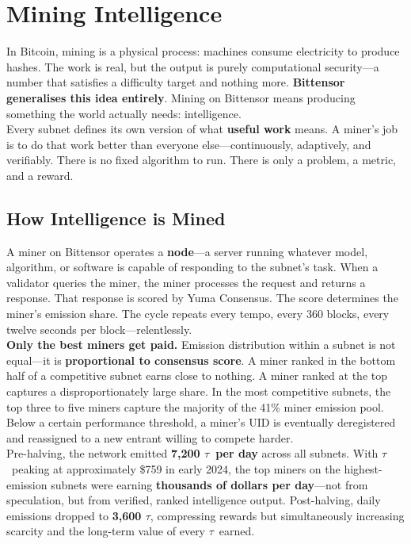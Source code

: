 \documentclass[12pt, a4paper, oneside]{report}
\newcommand{\TAO}{$\tau$}            %
\theoremstyle{definition}
\begin{document}
\chapter{Mining Intelligence}
\label{chap:mining_intelligence}

In Bitcoin, mining is a physical process: machines consume electricity to 
produce hashes. The work is real, but the output is purely computational 
security—a number that satisfies a difficulty target and nothing more. 
\textbf{Bittensor generalises this idea entirely}. Mining on Bittensor 
means producing something the world actually needs: intelligence.\\[0.4cm]

Every subnet defines its own version of what \textbf{useful work} means. 
A miner's job is to do that work better than everyone else—continuously, 
adaptively, and verifiably. There is no fixed algorithm to run. There is 
only a problem, a metric, and a reward.

\section{How Intelligence is Mined}

A miner on Bittensor operates a \textbf{node}—a server running whatever 
model, algorithm, or software is capable of responding to the subnet's 
task. When a validator queries the miner, the miner processes the request 
and returns a response. That response is scored by Yuma Consensus. The 
score determines the miner's emission share. The cycle repeats every 
tempo, every 360 blocks, every twelve seconds per block—relentlessly.\\[0.4cm]

\textbf{Only the best miners get paid.} Emission distribution within a 
subnet is not equal—it is \textbf{proportional to consensus score}. A 
miner ranked in the bottom half of a competitive subnet earns close to 
nothing. A miner ranked at the top captures a disproportionately large 
share. In the most competitive subnets, the top three to five miners 
capture the majority of the 41\% miner emission pool. Below a certain 
performance threshold, a miner's UID is eventually deregistered and 
reassigned to a new entrant willing to compete harder.\\[0.4cm]

\noindent Pre-halving, the network emitted \textbf{7,200 \TAO\ per day} 
across all subnets. With \TAO\ peaking at approximately \$759 in early 
2024, the top miners on the highest-emission subnets were earning 
\textbf{thousands of dollars per day}—not from speculation, but from 
verified, ranked intelligence output. Post-halving, daily emissions 
dropped to \textbf{3,600 \TAO}, compressing rewards but simultaneously 
increasing scarcity and the long-term value of every \TAO\ earned.\\[0.4cm]
\end{document}
